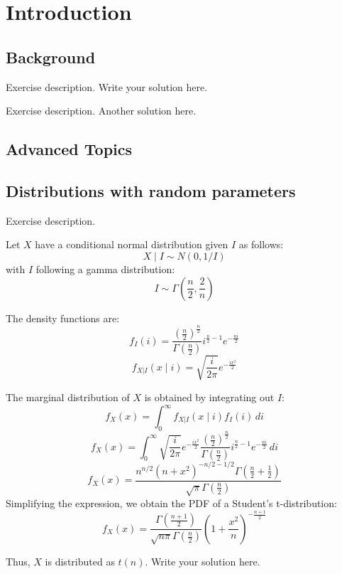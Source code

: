 \section{Introduction}

\subsection{Background}

\exercise
Exercise description.
\solution
Write your solution here.

\exercise
Exercise description.
\solution
Another solution here.

\subsection{Advanced Topics}
\subsection{Distributions with random parameters}

\exercise
\exercise
\exercise
Exercise description.
\solution

Let \( X \) have a conditional normal distribution given \( I \) as follows:
\[
X \mid I \sim N(0, 1/I)
\]
with \( I \) following a gamma distribution:
\[
I \sim \Gamma\left(\frac{n}{2}, \frac{2}{n}\right)
\]

The density functions are:
\[
f_I(i) = \frac{\left(\frac{n}{2}\right)^{\frac{n}{2}}}{\Gamma\left(\frac{n}{2}\right)} i^{\frac{n}{2} - 1} e^{-\frac{ni}{2}}
\]
\[
f_{X|I}(x \mid i) = \sqrt{\frac{i}{2\pi}} e^{-\frac{ix^2}{2}}
\]

The marginal distribution of \( X \) is obtained by integrating out \( I \):
\[
f_X(x) = \int_0^\infty f_{X|I}(x \mid i) f_I(i) \, di
\]
\[
f_X(x) = \int_0^\infty \sqrt{\frac{i}{2\pi}} e^{-\frac{ix^2}{2}} \frac{\left(\frac{n}{2}\right)^{\frac{n}{2}}}{\Gamma\left(\frac{n}{2}\right)} i^{\frac{n}{2} - 1} e^{-\frac{ni}{2}} \, di
\]
\[
f_X(x) = \frac{n^{n/2} (n + x^2)^{-n/2 - 1/2} \Gamma\left(\frac{n}{2} + \frac{1}{2}\right)}{\sqrt{\pi} \Gamma\left(\frac{n}{2}\right)}
\]
Simplifying the expression, we obtain the PDF of a Student's t-distribution:
\[
f_X(x) = \frac{\Gamma\left(\frac{n+1}{2}\right)}{\sqrt{n\pi} \Gamma\left(\frac{n}{2}\right)} \left(1 + \frac{x^2}{n}\right)^{-\frac{n+1}{2}}
\]

Thus, \( X \) is distributed as \( t(n) \).
Write your solution here.
